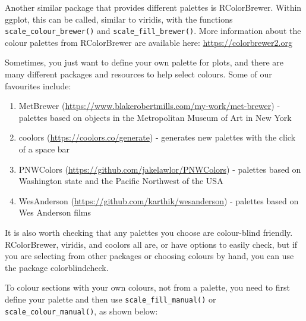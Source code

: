 \documentclass[
]{book}
\providecommand{\tightlist}{%
  \setlength{\itemsep}{0pt}\setlength{\parskip}{0pt}}
\begin{document}
Another similar package that provides different palettes is RColorBrewer. Within ggplot, this can be called, similar to viridis, with the functions \texttt{scale\_colour\_brewer()} and \texttt{scale\_fill\_brewer()}. More information about the colour palettes from RColorBrewer are available here: \url{https://colorbrewer2.org}

Sometimes, you just want to define your own palette for plots, and there are many different packages and resources to help select colours. Some of our favourites include:

\begin{enumerate}
\def\labelenumi{\arabic{enumi}.}
\tightlist
\item
  MetBrewer (\url{https://www.blakerobertmills.com/my-work/met-brewer}) - palettes based on objects in the Metropolitan Museum of Art in New York
\item
  coolors (\url{https://coolors.co/generate}) - generates new palettes with the click of a space bar
\item
  PNWColors (\url{https://github.com/jakelawlor/PNWColors}) - palettes based on Washington state and the Pacific Northwest of the USA
\item
  WesAnderson (\url{https://github.com/karthik/wesanderson}) - palettes based on Wes Anderson films
\end{enumerate}

It is also worth checking that any palettes you choose are colour-blind friendly. RColorBrewer, viridis, and coolors all are, or have options to easily check, but if you are selecting from other packages or choosing colours by hand, you can use the package colorblindcheck.

To colour sections with your own colours, not from a palette, you need to first define your palette and then use \texttt{scale\_fill\_manual()} or \texttt{scale\_colour\_manual()}, as shown below:
\end{document}

